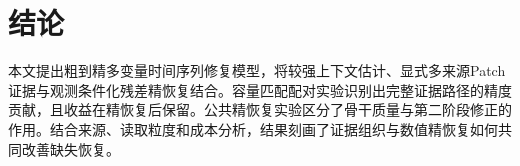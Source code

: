 \section{结论}\label{sec:conclusion}
本文提出粗到精多变量时间序列修复模型\Model{}，将较强上下文估计、显式多来源Patch证据与观测条件化残差精恢复结合。容量匹配配对实验识别出完整证据路径的精度贡献，且收益在精恢复后保留。公共精恢复实验区分了骨干质量与第二阶段修正的作用。结合来源、读取粒度和成本分析，结果刻画了证据组织与数值精恢复如何共同改善缺失恢复。
